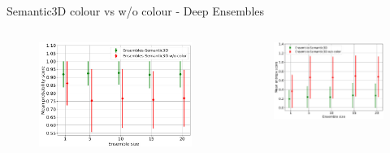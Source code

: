 \documentclass[aspectratio=169]{beamer}
\begin{document}
\begin{frame}{Semantic3D colour vs w/o colour - Deep Ensembles}
    \begin{columns}
        \begin{column}{0.5\textwidth}
            \begin{figure}
                \centering
                \includegraphics[scale=0.28]{images/ood2/DE_MSP_OOD2.jpg}
            \end{figure}
        \end{column}
        \begin{column}{0.5\textwidth}
            \begin{figure}
                \centering
                \includegraphics[scale=0.38]{images/ood2/DE_Ent_OOD2.jpg}
            \end{figure}
        \end{column}
    \end{columns}
\end{frame}
\end{document}
